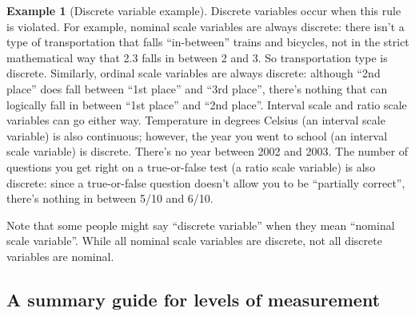 \documentclass[
  11pt,
]{book}
\theoremstyle{definition}
\theoremstyle{definition}
\newtheorem{example}{Example}[chapter]
\theoremstyle{definition}
\theoremstyle{definition}
\theoremstyle{remark}
\begin{document}
\begin{example}[Discrete variable example]
\protect\hypertarget{exm:exdiscrete}{}\label{exm:exdiscrete}Discrete variables occur when this rule is violated. For example, nominal scale variables are always discrete: there isn't a type of transportation that falls ``in-between'' trains and bicycles, not in the strict mathematical way that 2.3 falls in between 2 and 3. So transportation type is discrete. Similarly, ordinal scale variables are always discrete: although ``2nd place'' does fall between ``1st place'' and ``3rd place'', there's nothing that can logically fall in between ``1st place'' and ``2nd place''. Interval scale and ratio scale variables can go either way. Temperature in degrees Celsius (an interval scale variable) is also continuous; however, the year you went to school (an interval scale variable) is discrete. There's no year between 2002 and 2003. The number of questions you get right on a true-or-false test (a ratio scale variable) is also discrete: since a true-or-false question doesn't allow you to be ``partially correct'', there's nothing in between 5/10 and 6/10.
\end{example}

Note that some people might say ``discrete variable'' when they mean ``nominal scale variable''. While all nominal scale variables are discrete, not all discrete variables are nominal.

\hypertarget{summaryguidelevels}{%
\subsection{A summary guide for levels of measurement}\label{summaryguidelevels}}
\end{document}
